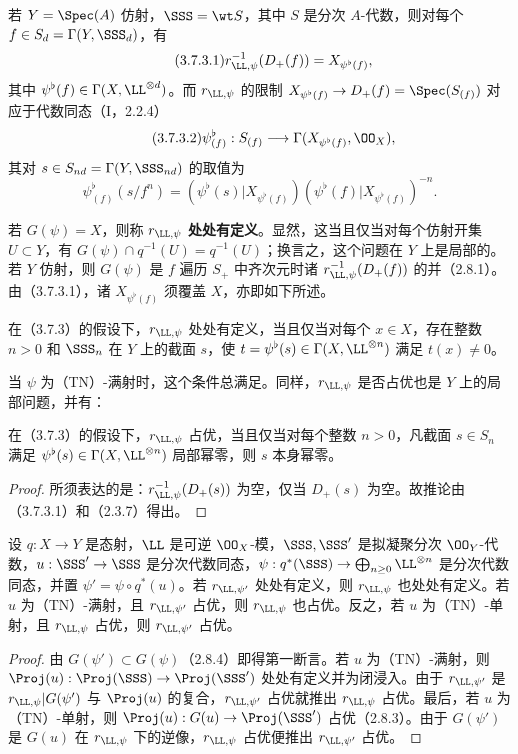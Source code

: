 若 $Y=\Spec(A)$ 仿射，$\SSS=\wt S$，其中 $S$ 是分次 $A$-代数，则对每个 $f\in S_d=\Gamma(Y,\SSS_d)$，有
\begin{equation}\tag{3.7.3.1}r_{\LL,\psi}^{-1}(D_+(f))=X_{\psi^\flat(f)},\end{equation}
其中 $\psi^\flat(f)\in\Gamma(X,\LL^{\otimes d})$。而 $r_{\LL,\psi}$ 的限制
$X_{\psi^\flat(f)}\to D_+(f)=\Spec(S_{(f)})$ 对应于代数同态（I，2.2.4）
\begin{equation}\tag{3.7.3.2}
\psi^\flat_{(f)}:S_{(f)}\longrightarrow\Gamma(X_{\psi^\flat(f)},\OO_X),
\end{equation}
其对 $s\in S_{nd}=\Gamma(Y,\SSS_{nd})$ 的取值为
\begin{equation}\tag{3.7.3.3}
\psi^\flat_{(f)}(s/f^n)
=(\psi^\flat(s)|X_{\psi^\flat(f)})
(\psi^\flat(f)|X_{\psi^\flat(f)})^{-n}.
\end{equation}

若 $G(\psi)=X$，则称 $r_{\LL,\psi}$ \textbf{处处有定义}。显然，这当且仅当对每个仿射开集 $U\subset Y$，有
$G(\psi)\cap q^{-1}(U)=q^{-1}(U)$；换言之，这个问题在 $Y$ 上是局部的。若 $Y$ 仿射，则 $G(\psi)$ 是 $f$ 遍历 $S_+$ 中齐次元时诸 $r_{\LL,\psi}^{-1}(D_+(f))$ 的并（2.8.1）。由（3.7.3.1），诸 $X_{\psi^\flat(f)}$ 须覆盖 $X$，亦即如下所述。

在（3.7.3）的假设下，$r_{\LL,\psi}$ 处处有定义，当且仅当对每个 $x\in X$，存在整数 $n>0$ 和 $\SSS_n$ 在 $Y$ 上的截面 $s$，使 $t=\psi^\flat(s)\in\Gamma(X,\LL^{\otimes n})$ 满足 $t(x)\ne0$。

当 $\psi$ 为（TN）-满射时，这个条件总满足。同样，$r_{\LL,\psi}$ 是否占优也是 $Y$ 上的局部问题，并有：

在（3.7.3）的假设下，$r_{\LL,\psi}$ 占优，当且仅当对每个整数 $n>0$，凡截面 $s\in S_n$ 满足 $\psi^\flat(s)\in\Gamma(X,\LL^{\otimes n})$ 局部幂零，则 $s$ 本身幂零。
\begin{proof}
所须表达的是：$r_{\LL,\psi}^{-1}(D_+(s))$ 为空，仅当 $D_+(s)$ 为空。故推论由（3.7.3.1）和（2.3.7）得出。
\end{proof}

设 $q:X\to Y$ 是态射，$\LL$ 是可逆 $\OO_X$-模，$\SSS,\SSS'$ 是拟凝聚分次 $\OO_Y$-代数，$u:\SSS'\to\SSS$ 是分次代数同态，$\psi:q^*(\SSS)\to\bigoplus_{n\geq0}\LL^{\otimes n}$ 是分次代数同态，并置 $\psi'=\psi\circ q^*(u)$。若 $r_{\LL,\psi'}$ 处处有定义，则 $r_{\LL,\psi}$ 也处处有定义。若 $u$ 为（TN）-满射，且 $r_{\LL,\psi'}$ 占优，则 $r_{\LL,\psi}$ 也占优。反之，若 $u$ 为（TN）-单射，且 $r_{\LL,\psi}$ 占优，则 $r_{\LL,\psi'}$ 占优。
\begin{proof}
由 $G(\psi')\subset G(\psi)$（2.8.4）即得第一断言。若 $u$ 为（TN）-满射，则 $\Proj(u):\Proj(\SSS)\to\Proj(\SSS')$ 处处有定义并为闭浸入。由于 $r_{\LL,\psi'}$ 是 $r_{\LL,\psi}|G(\psi')$ 与 $\Proj(u)$ 的复合，$r_{\LL,\psi'}$ 占优就推出 $r_{\LL,\psi}$ 占优。最后，若 $u$ 为（TN）-单射，则 $\Proj(u):G(u)\to\Proj(\SSS')$ 占优（2.8.3）。由于 $G(\psi')$ 是 $G(u)$ 在 $r_{\LL,\psi}$ 下的逆像，$r_{\LL,\psi}$ 占优便推出 $r_{\LL,\psi'}$ 占优。
\end{proof}


